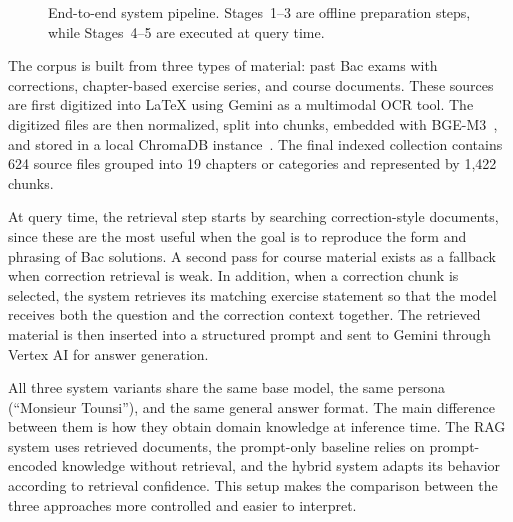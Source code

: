 \begin{figure}[H]
{%
}
\caption{End-to-end system pipeline. Stages~1--3 are offline preparation
steps, while Stages~4--5 are executed at query time.}
\label{fig:system-architecture}
\end{figure}

The corpus is built from three types of material: past Bac exams with
corrections, chapter-based exercise series, and course documents. These
sources are first digitized into \LaTeX{} using Gemini as a multimodal OCR
tool. The digitized files are then normalized, split into chunks, embedded
with BGE-M3~\cite{chen2024bge_m3}, and stored in a local ChromaDB
instance~\cite{chromadb2024}. The final indexed collection contains 624
source files grouped into 19 chapters or categories and represented by
1{,}422 chunks.

At query time, the retrieval step starts by searching correction-style
documents, since these are the most useful when the goal is to reproduce the
form and phrasing of Bac solutions. A second pass for course material exists
as a fallback when correction retrieval is weak. In addition, when a
correction chunk is selected, the system retrieves its matching exercise
statement so that the model receives both the question and the correction
context together. The retrieved material is then inserted into a structured
prompt and sent to Gemini through Vertex AI for answer generation.

All three system variants share the same base model, the same persona
(``Monsieur Tounsi''), and the same general answer format. The main
difference between them is how they obtain domain knowledge at inference
time. The RAG system uses retrieved documents, the prompt-only baseline
relies on prompt-encoded knowledge without retrieval, and the hybrid system
adapts its behavior according to retrieval confidence. This setup makes the
comparison between the three approaches more controlled and easier to
interpret.

